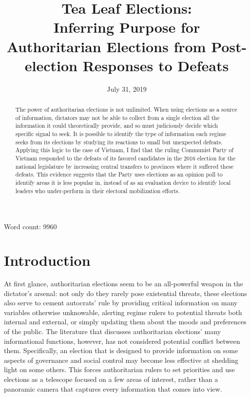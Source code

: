 \documentclass[12pt]{article}
\title{Tea Leaf Elections: \\
	Inferring Purpose for Authoritarian Elections from Post-election Responses to Defeats}
\date{July 31, 2019}
\newcommand{\1}{\mathbbm{1}}
\begin{document}
	

\maketitle
\thispagestyle{empty}
\doublespacing

\begin{abstract}
The power of authoritarian elections is not unlimited. When using elections as a source of information, dictators may not be able to collect from a single election all the information it could theoretically provide, and so must judiciously decide which specific signal to seek. It is possible to identify the type of information each regime seeks from its elections by studying its reactions to small but unexpected defeats. Applying this logic to the case of Vietnam, I find that the ruling Communist Party of Vietnam responded to the defeats of its favored candidates in the 2016 election for the national legislature by increasing central transfers to provinces where it suffered these defeats. This evidence suggests that the Party uses elections as an opinion poll to identify areas it is less popular in, instead of as an evaluation device to identify local leaders who under-perform in their electoral mobilization efforts.
\end{abstract}

Word count: 9960


\newpage
{}

\section{Introduction}

At first glance, authoritarian elections seem to be an all-powerful weapon in the dictator's arsenal: not only do they rarely pose existential threats, these elections also serve to cement autocrats' rule by providing critical information on many variables otherwise unknowable, alerting regime rulers to potential threats both internal and external, or simply updating them about the moods and preferences of the public. The literature that discusses authoritarian elections' many informational functions, however, has not considered potential conflict between them. Specifically, an election that is designed to provide information on some aspects of governance and social control may become less effective at shedding light on some others. This forces authoritarian rulers to set priorities and use elections as a telescope focused on a few areas of interest, rather than a panoramic camera that captures every information that comes into view.
\end{document}
